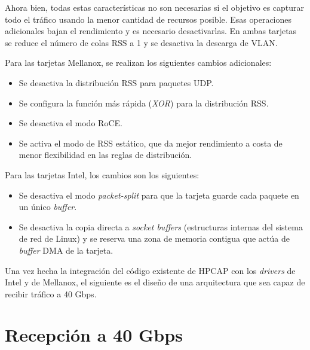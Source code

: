 \documentclass[twoside, 12pt, draft]{epstfg}
\begin{document}
Ahora bien, todas estas características no son necesarias si el objetivo es capturar todo el tráfico usando la menor cantidad de recursos posible. Esas operaciones adicionales bajan el rendimiento y es necesario desactivarlas. En ambas tarjetas se reduce el número de colas \gls{RSS} a 1 y se desactiva la descarga de VLAN.

Para las tarjetas Mellanox, se realizan los siguientes cambios adicionales:

\begin{itemize}[itemsep = 0pt, topsep = 3pt]
\item Se desactiva la distribución \gls{RSS} para paquetes UDP.
\item Se configura la función más rápida (\textit{XOR}) para la distribución \gls{RSS}.
\item Se desactiva el modo \gls{RoCE}.
\item Se activa el modo de \gls{RSS} estático, que da mejor rendimiento a costa de menor flexibilidad en las reglas de distribución.
\end{itemize}

Para las tarjetas Intel, los cambios son los siguientes:

\begin{itemize}[itemsep = 0pt, topsep = 3pt]
\item Se desactiva el modo \textit{packet-split} para que la tarjeta guarde cada paquete en un único \textit{buffer}.
\item Se desactiva la copia directa a \textit{socket buffers} (estructuras internas del sistema de red de Linux) y se reserva una zona de memoria contigua que actúa de \textit{buffer} \gls{DMA} de la tarjeta.
\end{itemize}

Una vez hecha la integración del código existente de HPCAP con los \textit{drivers} de Intel y de Mellanox, el siguiente es el diseño de una arquitectura que sea capaz de recibir tráfico a 40 Gbps.

\section{Recepción a 40 Gbps}
\label{sec:Desarrollo:Recepcion40Gbps}
\end{document}
